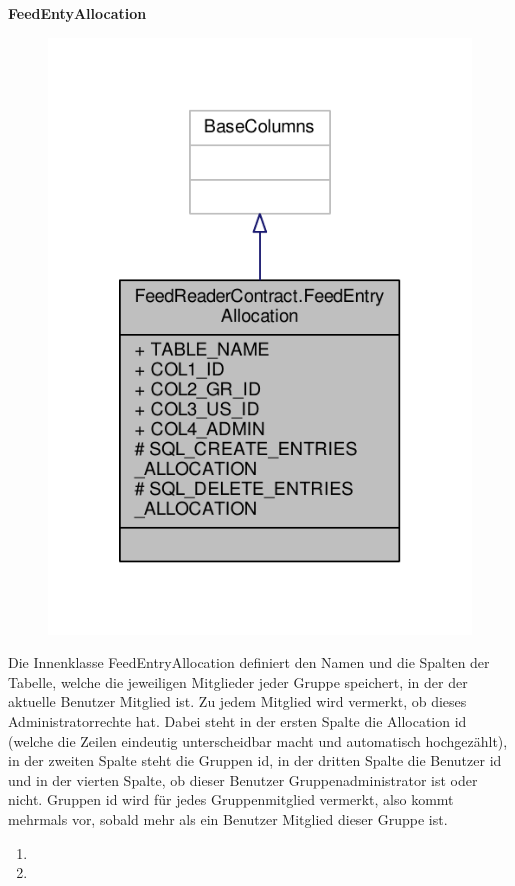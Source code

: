 \textbf{FeedEntyAllocation}
\begin{figure}[H]
	\includegraphics[scale = 1]{res/umlClasses/feed_reader_contract_allocation.pdf}
	\centering
\end{figure}
Die Innenklasse FeedEntryAllocation definiert den Namen und die Spalten der Tabelle, welche die jeweiligen Mitglieder jeder Gruppe speichert, in der der aktuelle Benutzer Mitglied ist. Zu jedem Mitglied wird vermerkt, ob dieses Administratorrechte hat.
Dabei steht in der ersten Spalte die Allocation id (welche die Zeilen eindeutig unterscheidbar macht und automatisch hochgezählt), in der zweiten Spalte steht die Gruppen id, in der dritten Spalte die Benutzer id und in der vierten Spalte, ob dieser Benutzer Gruppenadministrator ist oder nicht. 
Gruppen id wird für jedes Gruppenmitglied vermerkt, also kommt mehrmals vor, sobald mehr als ein Benutzer Mitglied dieser Gruppe ist. 
\begin{enumerate}
	\item
	\item
\end{enumerate}


